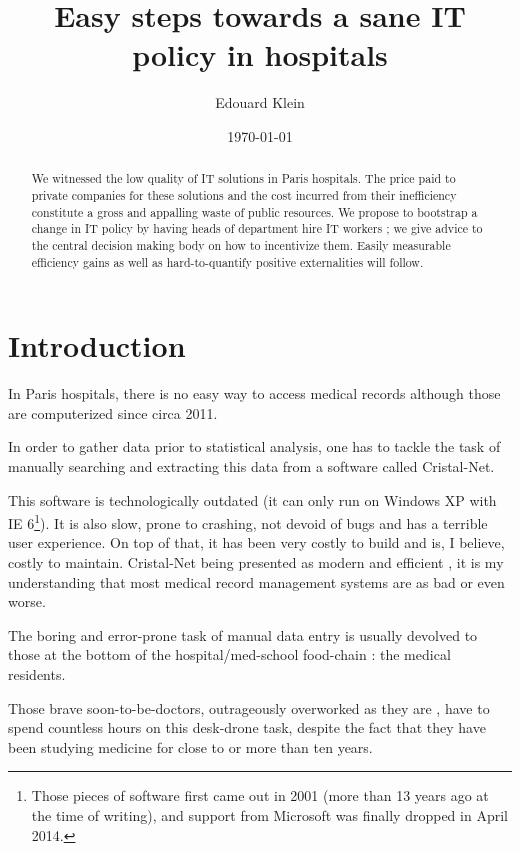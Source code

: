 \documentclass[nobib]{tufte-handout}
\title{Easy steps towards a sane IT policy in hospitals}
\author{Edouard Klein}
\date{\today}
\begin{document}
\maketitle

\begin{abstract}
We witnessed the low quality of IT solutions in Paris hospitals. The price paid to private companies for these solutions and the cost incurred from their inefficiency constitute a gross and appalling waste of public resources. We propose to bootstrap a change in IT policy by having heads of department hire IT workers ; we give advice to the central decision making body on how to incentivize them. Easily measurable efficiency gains as well as hard-to-quantify positive externalities will follow.
\end{abstract}

\setcounter{tocdepth}{4}
\tableofcontents

\section{Introduction}
\label{sec:introduction}

In Paris hospitals, there is no easy way to access medical records although those are computerized since circa 2011.

In order to gather data prior to statistical analysis, one has to tackle the task of manually searching and extracting this data from a software called Cristal-Net.

This software is technologically outdated (it can only run on Windows XP with IE 6\footnote{Those pieces of software first came out in 2001 (more than 13 years ago at the time of writing), and support from Microsoft was finally dropped in April 2014.}). It is also slow, prone to crashing, not devoid of  bugs and has a terrible user experience. On top of that, it has been very costly to build and is, I believe, costly to maintain. Cristal-Net being presented as modern and efficient \cite{cristalnet}, it is my understanding that most medical record management systems are as bad or even worse.

The boring and error-prone task of manual data entry is usually devolved to those at the bottom of the hospital/med-school food-chain : the medical residents.

Those brave soon-to-be-doctors, outrageously overworked as they are \cite[in french]{internesFIXME}, have to spend countless hours on this desk-drone task, despite the fact that they have been studying medicine for close to or more than ten years.
\end{document}

